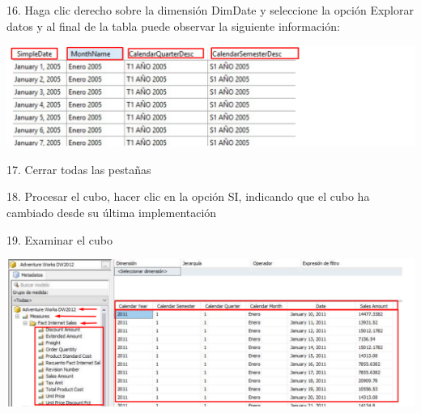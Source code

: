 16. Haga clic derecho sobre la dimensión DimDate y seleccione la opción Explorar datos y al final de la tabla puede
observar la siguiente información:

	\begin{center}
	\includegraphics[width=\columnwidth]{images/task6/img5}
	\end{center}	

17. Cerrar todas las pestañas

18. Procesar el cubo, hacer clic en la opción SI, indicando que el cubo ha cambiado desde su última implementación

19. Examinar el cubo

	\begin{center}
	\includegraphics[width=\columnwidth]{images/task6/img6}
	\end{center}	